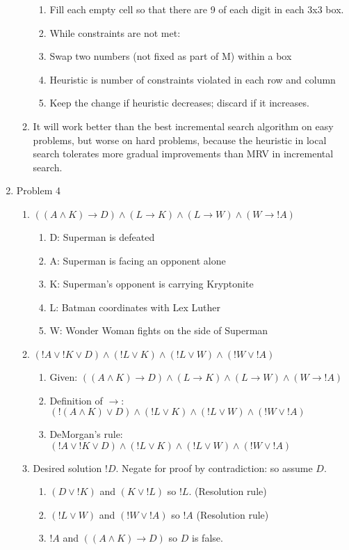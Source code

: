 \documentclass[11pt]{article}
\begin{document}
\begin{enumerate}
\begin{enumerate}
\begin{enumerate}
\item Fill each empty cell so that there are 9 of each digit in each 3x3 box.
\item While constraints are not met:
\item Swap two numbers (not fixed as part of M) within a box
\item Heuristic is number of constraints violated in each row and column
\item Keep the change if heuristic decreases; discard if it increases.
\end{enumerate}
\item It will work better than the best incremental search algorithm on easy problems, but worse on hard problems, because the heuristic in local search tolerates more gradual improvements than MRV in incremental search.
\end{enumerate}

\item Problem 4
\begin{enumerate}
\item $((A \land K) \to D) \land (L \to K) \land (L \to W) \land (W \to !A)$
\begin{enumerate}
\item D: Superman is defeated
\item A: Superman is facing an opponent alone
\item K: Superman's opponent is carrying Kryptonite
\item L: Batman coordinates with Lex Luther
\item W: Wonder Woman fights on the side of Superman
\end{enumerate}
\item $(!A \lor !K \lor D) \land (!L \lor K) \land (!L \lor W) \land (!W \lor !A)$
\begin{enumerate}
\item Given: $((A \land K) \to D) \land (L \to K) \land (L \to W) \land (W \to !A)$
\item Definition of $\to$: $(!(A \land K) \lor D) \land (!L \lor K) \land (!L \lor W) \land (!W \lor !A)$
\item DeMorgan's rule: $(!A \lor !K \lor D) \land (!L \lor K) \land (!L \lor W) \land (!W \lor !A)$
\end{enumerate}
\item Desired solution $!D$. Negate for proof by contradiction: so assume $D$.
\begin{enumerate}
\item $(D \lor !K)$ and $(K \lor !L)$ so $!L$. (Resolution rule)
\item $(!L \lor W)$ and $(!W \lor !A)$ so $!A$ (Resolution rule)
\item $!A$ and $((A \land K) \to D)$ so $D$ is false.
\end{enumerate}
\end{enumerate}


\end{enumerate}
\end{document}
